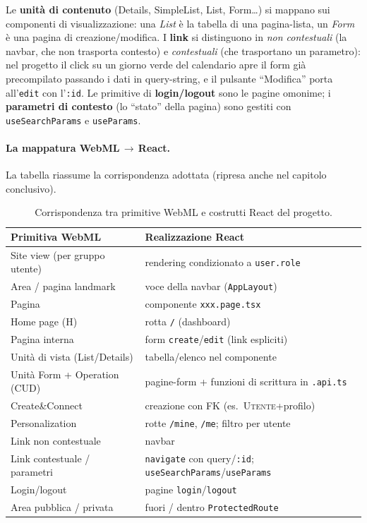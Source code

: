 \documentclass[11pt,a4paper,oneside]{report}
\newcommand{\code}[1]{\texttt{\small #1}}
\newcommand{\file}[1]{\texttt{\small #1}}
\begin{document}
Le \textbf{unità di contenuto} (Details, SimpleList, List, Form\ldots) si mappano
sui componenti di visualizzazione: una \emph{List} è la tabella di una pagina-lista,
un \emph{Form} è una pagina di creazione/modifica. I \textbf{link} si distinguono
in \emph{non contestuali} (la navbar, che non trasporta contesto) e
\emph{contestuali} (che trasportano un parametro): nel progetto il click su un
giorno verde del calendario apre il form già precompilato passando i dati in
query-string, e il pulsante ``Modifica'' porta all'\code{edit} con l'\code{:id}.
Le primitive di \textbf{login/logout} sono le pagine omonime; i \textbf{parametri
di contesto} (lo ``stato'' della pagina) sono gestiti con \code{useSearchParams} e
\code{useParams}.

\paragraph{La mappatura WebML$\,\rightarrow\,$React.} La tabella riassume la
corrispondenza adottata (ripresa anche nel capitolo conclusivo).

\begin{table}[h]
\centering
\renewcommand{\arraystretch}{1.25}
\begin{tabularx}{\linewidth}{@{}lX@{}}
\toprule
\textbf{Primitiva WebML} & \textbf{Realizzazione React} \\
\midrule
Site view (per gruppo utente) & rendering condizionato a \code{user.role} \\
Area / pagina landmark        & voce della navbar (\code{AppLayout}) \\
Pagina                        & componente \file{xxx.page.tsx} \\
Home page (H)                 & rotta \code{/} (dashboard) \\
Pagina interna                & form \code{create}/\code{edit} (link espliciti) \\
Unità di vista (List/Details) & tabella/elenco nel componente \\
Unità Form + Operation (CUD)  & pagine-form + funzioni di scrittura in \file{*.api.ts} \\
Create\&Connect               & creazione con FK (es.\ \textsc{Utente}+profilo) \\
Personalization               & rotte \code{/mine}, \code{/me}; filtro per utente \\
Link non contestuale          & navbar \\
Link contestuale / parametri  & \code{navigate} con query/\code{:id}; \code{useSearchParams}/\code{useParams} \\
Login/logout                  & pagine \file{login}/\file{logout} \\
Area pubblica / privata        & fuori / dentro \code{ProtectedRoute} \\
\bottomrule
\end{tabularx}
\caption{Corrispondenza tra primitive WebML e costrutti React del progetto.}
\label{tab:webml-react}
\end{table}
\end{document}
